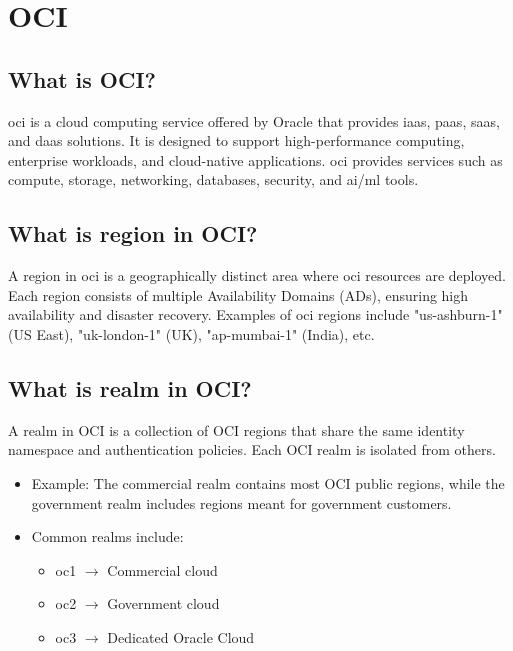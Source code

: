 \documentclass[../main.tex]{subfiles}
\begin{document}
\chapter{OCI}
\section{What is OCI?}
\acrfull{oci} is a cloud computing service offered by Oracle that provides \acrfull{iaas}, \acrfull{paas}, \acrfull{saas}, and \acrfull{daas} solutions.
It is designed to support high-performance computing, enterprise workloads, and cloud-native applications.
\acrshort{oci} provides services such as compute, storage, networking, databases, security, and \acrshort{ai}/\acrshort{ml} tools.

\section{What is region in OCI?}
A region in \acrshort{oci} is a geographically distinct area where \acrshort{oci} resources are deployed.
Each region consists of multiple Availability Domains (ADs), ensuring high availability and disaster recovery.
Examples of \acrshort{oci} regions include "us-ashburn-1" (US East), "uk-london-1" (UK), "ap-mumbai-1" (India), etc.

\section{What is realm in OCI?}
A realm in OCI is a collection of OCI regions that share the same identity namespace and authentication policies.
Each OCI realm is isolated from others.
\begin{itemize}
  \item {Example: The commercial realm contains most OCI public regions, while the government realm includes regions meant for government customers.}
  \item {Common realms include:
      \begin{itemize}
        \item oc1 $\rightarrow$ Commercial cloud
        \item oc2 $\rightarrow$ Government cloud
        \item oc3 $\rightarrow$ Dedicated Oracle Cloud
      \end{itemize}
    }
\end{itemize}

\end{document}
